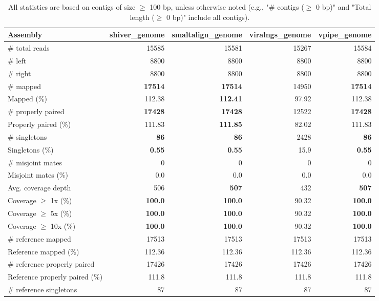 \documentclass[12pt,a4paper]{article}
\begin{document}
\begin{table}[ht]
\begin{center}
\caption{All statistics are based on contigs of size $\geq$ 100 bp, unless otherwise noted (e.g., "\# contigs ($\geq$ 0 bp)" and "Total length ($\geq$ 0 bp)" include all contigs).}
\begin{tabular}{|l*{4}{|r}|}
\hline
Assembly & shiver\_genome & smaltalign\_genome & viralngs\_genome & vpipe\_genome \\ \hline
\# total reads & 15585 & 15581 & 15267 & 15584 \\ \hline
\# left & 8800 & 8800 & 8800 & 8800 \\ \hline
\# right & 8800 & 8800 & 8800 & 8800 \\ \hline
\# mapped & {\bf 17514} & {\bf 17514} & 14950 & {\bf 17514} \\ \hline
Mapped (\%) & 112.38 & {\bf 112.41} & 97.92 & 112.38 \\ \hline
\# properly paired & {\bf 17428} & {\bf 17428} & 12522 & {\bf 17428} \\ \hline
Properly paired (\%) & 111.83 & {\bf 111.85} & 82.02 & 111.83 \\ \hline
\# singletons & {\bf 86} & {\bf 86} & 2428 & {\bf 86} \\ \hline
Singletons (\%) & {\bf 0.55} & {\bf 0.55} & 15.9 & {\bf 0.55} \\ \hline
\# misjoint mates & 0 & 0 & 0 & 0 \\ \hline
Misjoint mates (\%) & 0.0 & 0.0 & 0.0 & 0.0 \\ \hline
Avg. coverage depth & 506 & {\bf 507} & 432 & {\bf 507} \\ \hline
Coverage $\geq$ 1x (\%) & {\bf 100.0} & {\bf 100.0} & 90.32 & {\bf 100.0} \\ \hline
Coverage $\geq$ 5x (\%) & {\bf 100.0} & {\bf 100.0} & 90.32 & {\bf 100.0} \\ \hline
Coverage $\geq$ 10x (\%) & {\bf 100.0} & {\bf 100.0} & 90.32 & {\bf 100.0} \\ \hline
\# reference mapped & 17513 & 17513 & 17513 & 17513 \\ \hline
Reference mapped (\%) & 112.36 & 112.36 & 112.36 & 112.36 \\ \hline
\# reference properly paired & 17426 & 17426 & 17426 & 17426 \\ \hline
Reference properly paired (\%) & 111.8 & 111.8 & 111.8 & 111.8 \\ \hline
\# reference singletons & 87 & 87 & 87 & 87 \\ \hline

\end{tabular}
\end{center}
\end{table}
\end{document}
